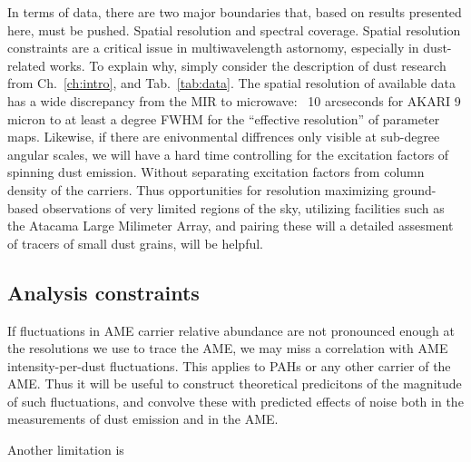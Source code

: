   In terms of data, there are two major boundaries that, based on results presented here, must be pushed. Spatial resolution and spectral coverage.
  Spatial resolution constraints are a critical issue in multiwavelength astornomy, especially in dust-related works. To explain why, simply consider the description of dust research from Ch.~\ref{ch:intro}, and Tab.~\ref{tab:data}. The spatial resolution of available data has a wide discrepancy from the MIR to microwave: ~10 arcseconds for AKARI 9 micron to at least a degree FWHM for the ``effective resolution'' of parameter maps. Likewise, if there are enivonmental diffrences only visible at sub-degree angular scales, we will have a hard time controlling for the excitation factors of spinning dust emission. Without separating excitation factors from column density of the carriers. Thus opportunities for resolution maximizing ground-based observations of very limited regions of the sky, utilizing facilities such as the Atacama Large Milimeter Array, and pairing these will a detailed assesment of tracers of small dust grains, will be helpful.

  \subsection{Analysis constraints}
  If fluctuations in AME carrier relative abundance are not pronounced enough at the resolutions we use to trace the AME, we may miss a correlation with AME intensity-per-dust fluctuations. This applies to PAHs or any other carrier of the AME. Thus it will be useful to construct theoretical predicitons of the magnitude of such fluctuations, and convolve these with predicted effects of noise both in the measurements of dust emission and in the AME.

  Another limitation is 
